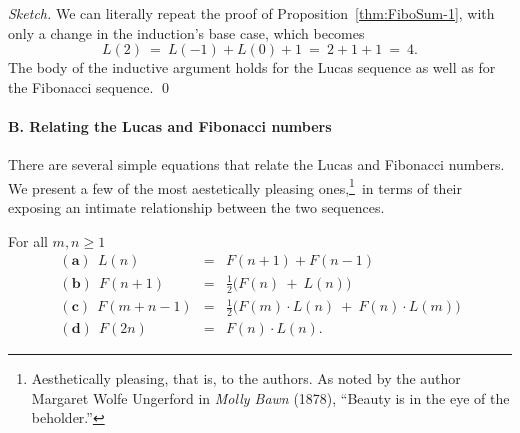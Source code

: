 \begin{proof}[Sketch]
We can literally repeat the proof of Proposition~\ref{thm:FiboSum-1},
with only a change in the induction's base case, which becomes
\[ L(2) \ = \ L(-1) + L(0) + 1 \ = \ 2 + 1 + 1 \ = \ 4. \]
The body of the inductive argument holds for the Lucas sequence as
well as for the Fibonacci sequence.
\qed
\end{proof}

\paragraph{\small\sf B. Relating the Lucas and Fibonacci numbers}

There are several simple equations that relate the Lucas and Fibonacci
numbers.  We present a few of the most aestetically pleasing
ones,\footnote{Aesthetically pleasing, that is, to the authors.  As
  noted by the author Margaret Wolfe Ungerford in {\it Molly Bawn}
  (1878), ``Beauty is in the eye of
  the beholder.''}~in terms of their exposing an intimate
relationship between the two sequences.

\begin{prop}
\label{thm:Lucas-n:2Fibs}
For all $m, n \geq 1$
\begin{eqnarray}
\label{eq:L-F-a}
\mathbf{(a) } \ \ 
L(n) & = & F(n+1) + F(n-1) \\
\label{eq:L-F-b}
\mathbf{(b) } \ \
F(n+1) & = & \frac{1}{2} \big(F(n) \ + \ L(n) \big) \\
\label{eq:L-F-c}
\mathbf{(c) } \ \
F(m + n-1) & = & \frac{1}{2} \big( F(m) \cdot L(n) \ + \ F(n) \cdot L(m) \big) \\
\label{eq:L-F-d}
\mathbf{(d) } \ \
F(2n) & = & F(n) \cdot L(n).
\end{eqnarray}
\end{prop}

